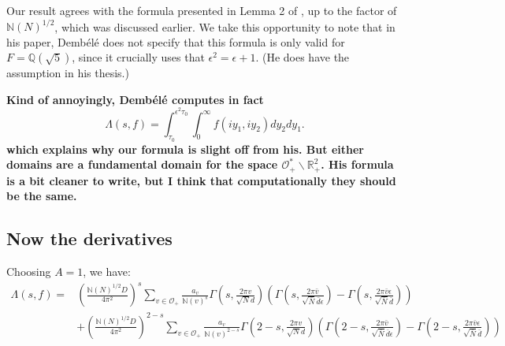 \documentclass{article}
\theoremstyle{plain}
\begin{document}
Our result agrees with the formula presented in Lemma 2 of \cite{dembele}, up to the factor of $\mathbb{N}(N)^{1/2}$, which was discussed earlier. We take this opportunity to note that in his paper, Demb\'{e}l\'{e} does not specify that this formula is only valid for $F=\mathbb{Q}(\sqrt{5})$, since it crucially uses that $\epsilon^2=\epsilon+1$. (He does have the assumption in his thesis.)

\textbf{Kind of annoyingly, Demb\'{e}l\'{e} computes in fact
\begin{equation*}
\Lambda(s,f)= \int_{\tau_0}^{\epsilon^2 \tau_0}\int_{0}^{\infty} f\left(iy_1,iy_2\right)  dy_2 dy_1.
\end{equation*}
which explains why our formula is slight off from his. But either domains are a fundamental domain for the space $\mathcal{O}_+^*\backslash \mathbb{R}^2_+$. His formula is a bit cleaner to write, but I think that computationally they should be the same.}






\subsection{Now the derivatives}

Choosing $A=1$, we have:
\begin{equation*}
\begin{split}
\Lambda(s,f)=& \left(\frac{\mathbb{N}(N)^{1/2}D}{4\pi^2}\right)^s \sum_{v \in \mathcal{O}_+} \frac{a_v}{\mathbb{N}(v)^s} \Gamma\left(s, \frac{2\pi v }{\sqrt{N}d}\right) \left(\Gamma\left(s,\frac{2 \pi \bar{v}}{\sqrt{\bar{N}}\bar{d} \epsilon} \right)-  \Gamma\left(s,\frac{2 \pi \bar{v}\epsilon}{\sqrt{\bar{N}}\bar{d} } \right) \right) \\
&+ \left(\frac{\mathbb{N}(N)^{1/2}D}{4\pi^2}\right)^{2-s}\sum_{v \in \mathcal{O}_+} \frac{a_v}{\mathbb{N}(v)^{2-s}} \Gamma\left(2-s, \frac{2\pi v }{\sqrt{N}d}\right) \left(\Gamma\left(2-s,\frac{2 \pi \bar{v}}{\sqrt{\bar{N}}\bar{d} \epsilon} \right)-  \Gamma\left(2-s,\frac{2 \pi \bar{v}\epsilon}{\sqrt{\bar{N}}\bar{d} } \right) \right)
\end{split}
\end{equation*}
\end{document}
